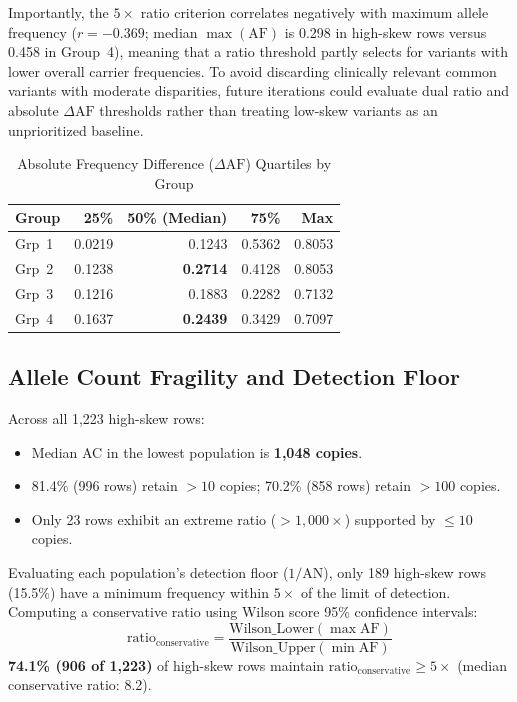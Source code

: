 \documentclass[conference]{IEEEtran}
\begin{document}
\begin{table}[!t]
Importantly, the $5\times$ ratio criterion correlates negatively with maximum allele frequency ($r = -0.369$; median $\max(\text{AF})$ is 0.298 in high-skew rows versus 0.458 in Group~4), meaning that a ratio threshold partly selects for variants with lower overall carrier frequencies.
To avoid discarding clinically relevant common variants with moderate disparities, future iterations could evaluate dual ratio and absolute $\Delta\text{AF}$ thresholds rather than treating low-skew variants as an unprioritized baseline.

\begin{table}[!t]
\centering
\caption{Absolute Frequency Difference ($\Delta\text{AF}$) Quartiles by Group}
\label{tab:delta-af}
\renewcommand{\arraystretch}{1.15}
\begin{tabular}{|l|r|r|r|r|}
\hline
\textbf{Group} & \textbf{25\%} & \textbf{50\% (Median)} & \textbf{75\%} & \textbf{Max} \\
\hline
\textcolor{group1}{Grp~1} & 0.0219 & 0.1243 & 0.5362 & 0.8053 \\
\hline
\textcolor{group2}{Grp~2} & 0.1238 & \textbf{0.2714} & 0.4128 & 0.8053 \\
\hline
\textcolor{group3}{Grp~3} & 0.1216 & 0.1883 & 0.2282 & 0.7132 \\
\hline
\textcolor{group4}{Grp~4} & 0.1637 & \textbf{0.2439} & 0.3429 & 0.7097 \\
\hline
\end{tabular}
\end{table}

\subsection{Allele Count Fragility and Detection Floor}

Across all 1,223 high-skew rows:
\begin{itemize}
    \item Median AC in the lowest population is \textbf{1,048 copies}.
    \item 81.4\% (996 rows) retain $>10$ copies; 70.2\% (858 rows) retain $>100$ copies.
    \item Only 23 rows exhibit an extreme ratio ($>1{,}000\times$) supported by $\le 10$ copies.
\end{itemize}
Evaluating each population's detection floor ($1/\text{AN}$), only 189 high-skew rows (15.5\%) have a minimum frequency within $5\times$ of the limit of detection.
Computing a conservative ratio using Wilson score 95\% confidence intervals:
\begin{equation}
\text{ratio}_{\text{conservative}} = \frac{\text{Wilson\_Lower}(\max\text{AF})}{\text{Wilson\_Upper}(\min\text{AF})}
\end{equation}
\textbf{74.1\% (906 of 1,223)} of high-skew rows maintain $\text{ratio}_{\text{conservative}} \ge 5\times$ (median conservative ratio: 8.2).


\end{table}
\end{document}
